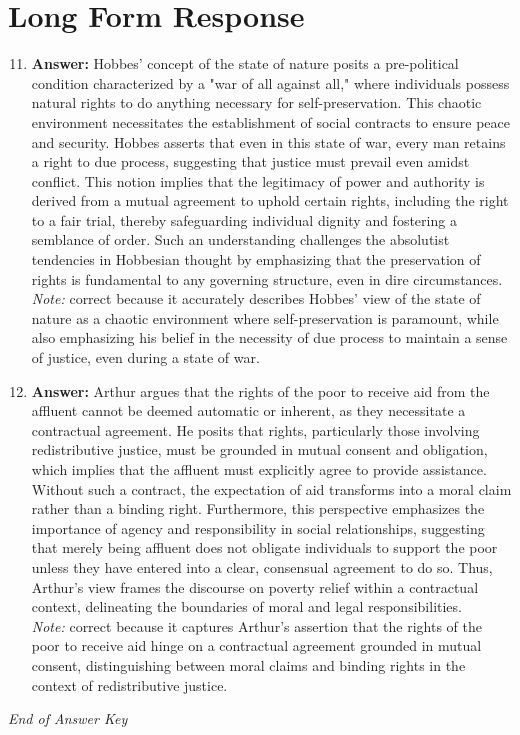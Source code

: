 \documentclass[12pt]{article}
\begin{document}
\section*{Long Form Response}
\begin{enumerate}[label=\arabic*.]
\setcounter{enumi}{10}
\item \textbf{Answer:} Hobbes' concept of the state of nature posits a pre-political condition characterized by a "war of all against all," where individuals possess natural rights to do anything necessary for self-preservation. This chaotic environment necessitates the establishment of social contracts to ensure peace and security. Hobbes asserts that even in this state of war, every man retains a right to due process, suggesting that justice must prevail even amidst conflict. This notion implies that the legitimacy of power and authority is derived from a mutual agreement to uphold certain rights, including the right to a fair trial, thereby safeguarding individual dignity and fostering a semblance of order. Such an understanding challenges the absolutist tendencies in Hobbesian thought by emphasizing that the preservation of rights is fundamental to any governing structure, even in dire circumstances.
\\ \textit{Note:} correct because it accurately describes Hobbes' view of the state of nature as a chaotic environment where self-preservation is paramount, while also emphasizing his belief in the necessity of due process to maintain a sense of justice, even during a state of war.
\item \textbf{Answer:} Arthur argues that the rights of the poor to receive aid from the affluent cannot be deemed automatic or inherent, as they necessitate a contractual agreement. He posits that rights, particularly those involving redistributive justice, must be grounded in mutual consent and obligation, which implies that the affluent must explicitly agree to provide assistance. Without such a contract, the expectation of aid transforms into a moral claim rather than a binding right. Furthermore, this perspective emphasizes the importance of agency and responsibility in social relationships, suggesting that merely being affluent does not obligate individuals to support the poor unless they have entered into a clear, consensual agreement to do so. Thus, Arthur's view frames the discourse on poverty relief within a contractual context, delineating the boundaries of moral and legal responsibilities.
\\ \textit{Note:} correct because it captures Arthur's assertion that the rights of the poor to receive aid hinge on a contractual agreement grounded in mutual consent, distinguishing between moral claims and binding rights in the context of redistributive justice.
\end{enumerate}

\vfill
\noindent\textit{End of Answer Key}
\end{document}
